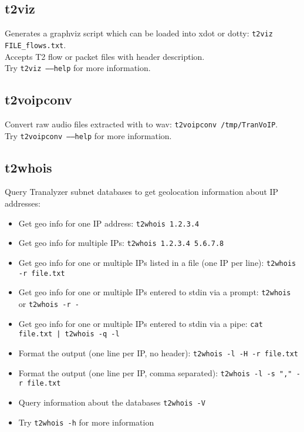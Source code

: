 \documentclass[documentation]{subfiles}
\begin{document}
\subsection{t2viz}\label{t2viz}
Generates a graphviz script which can be loaded into xdot or dotty: {\tt t2viz FILE\_flows.txt}.\\
\noindent Accepts T2 flow or packet files with header description.\\
\noindent Try {\tt t2viz --{}--help} for more information.

\subsection{t2voipconv}\label{t2voipconv}
Convert raw audio files extracted with  to wav: {\tt t2voipconv /tmp/TranVoIP}.\\
\noindent Try {\tt t2voipconv --{}--help} for more information.

\subsection{t2whois}\label{t2whois}
Query Tranalyzer subnet databases to get geolocation information about IP addresses:

\begin{itemize}
    \item Get geo info for one IP address: {\tt t2whois 1.2.3.4}
    \item Get geo info for multiple IPs: {\tt t2whois 1.2.3.4 5.6.7.8}
    \item Get geo info for one or multiple IPs listed in a file (one IP per line): {\tt t2whois -r file.txt}
    \item Get geo info for one or multiple IPs entered to stdin via a prompt: {\tt t2whois} or {\tt t2whois -r -}
    \item Get geo info for one or multiple IPs entered to stdin via a pipe: {\tt cat file.txt | t2whois -q -l}
    \item Format the output (one line per IP, no header): {\tt t2whois -l -H -r file.txt}
    \item Format the output (one line per IP, comma separated): {\tt t2whois -l -s "," -r file.txt}
    \item Query information about the databases {\tt t2whois -V}
    \item Try {\tt t2whois -h} for more information
\end{itemize}
\end{document}
